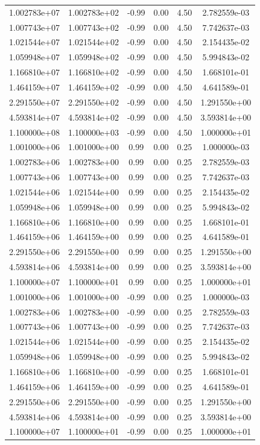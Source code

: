 \documentclass{article}
\begin{document}
\begin{table}[htbp]
\begin{tabular}{cccccc}
1.002783e+07 & 1.002783e+02 & -0.99 & 0.00 & 4.50 & 2.782559e-03 \\
1.007743e+07 & 1.007743e+02 & -0.99 & 0.00 & 4.50 & 7.742637e-03 \\
1.021544e+07 & 1.021544e+02 & -0.99 & 0.00 & 4.50 & 2.154435e-02 \\
1.059948e+07 & 1.059948e+02 & -0.99 & 0.00 & 4.50 & 5.994843e-02 \\
1.166810e+07 & 1.166810e+02 & -0.99 & 0.00 & 4.50 & 1.668101e-01 \\
1.464159e+07 & 1.464159e+02 & -0.99 & 0.00 & 4.50 & 4.641589e-01 \\
2.291550e+07 & 2.291550e+02 & -0.99 & 0.00 & 4.50 & 1.291550e+00 \\
4.593814e+07 & 4.593814e+02 & -0.99 & 0.00 & 4.50 & 3.593814e+00 \\
1.100000e+08 & 1.100000e+03 & -0.99 & 0.00 & 4.50 & 1.000000e+01 \\
1.001000e+06 & 1.001000e+00 & 0.99 & 0.00 & 0.25 & 1.000000e-03 \\
1.002783e+06 & 1.002783e+00 & 0.99 & 0.00 & 0.25 & 2.782559e-03 \\
1.007743e+06 & 1.007743e+00 & 0.99 & 0.00 & 0.25 & 7.742637e-03 \\
1.021544e+06 & 1.021544e+00 & 0.99 & 0.00 & 0.25 & 2.154435e-02 \\
1.059948e+06 & 1.059948e+00 & 0.99 & 0.00 & 0.25 & 5.994843e-02 \\
1.166810e+06 & 1.166810e+00 & 0.99 & 0.00 & 0.25 & 1.668101e-01 \\
1.464159e+06 & 1.464159e+00 & 0.99 & 0.00 & 0.25 & 4.641589e-01 \\
2.291550e+06 & 2.291550e+00 & 0.99 & 0.00 & 0.25 & 1.291550e+00 \\
4.593814e+06 & 4.593814e+00 & 0.99 & 0.00 & 0.25 & 3.593814e+00 \\
1.100000e+07 & 1.100000e+01 & 0.99 & 0.00 & 0.25 & 1.000000e+01 \\
1.001000e+06 & 1.001000e+00 & -0.99 & 0.00 & 0.25 & 1.000000e-03 \\
1.002783e+06 & 1.002783e+00 & -0.99 & 0.00 & 0.25 & 2.782559e-03 \\
1.007743e+06 & 1.007743e+00 & -0.99 & 0.00 & 0.25 & 7.742637e-03 \\
1.021544e+06 & 1.021544e+00 & -0.99 & 0.00 & 0.25 & 2.154435e-02 \\
1.059948e+06 & 1.059948e+00 & -0.99 & 0.00 & 0.25 & 5.994843e-02 \\
1.166810e+06 & 1.166810e+00 & -0.99 & 0.00 & 0.25 & 1.668101e-01 \\
1.464159e+06 & 1.464159e+00 & -0.99 & 0.00 & 0.25 & 4.641589e-01 \\
2.291550e+06 & 2.291550e+00 & -0.99 & 0.00 & 0.25 & 1.291550e+00 \\
4.593814e+06 & 4.593814e+00 & -0.99 & 0.00 & 0.25 & 3.593814e+00 \\
1.100000e+07 & 1.100000e+01 & -0.99 & 0.00 & 0.25 & 1.000000e+01 \\
\hline
\end{tabular}
\end{table}
\end{document}
